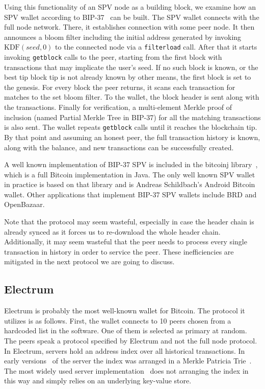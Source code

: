 \documentclass[sigconf,authordraft]{acmart}
\begin{document}
Using this functionality of an SPV node as a building block, we examine how an SPV wallet according to BIP-37~\cite{bip37} can be built. The SPV wallet connects with the full node network. There, it establishes connection with some peer node. It then announces a bloom filter including the initial address generated by invoking $\text{KDF}(seed, 0)$ to the connected node via a \texttt{filterload} call. After that it starts invoking \texttt{getblock} calls to the peer, starting from the first block with transactions that may implicate the user's seed. If no such block is known, or the best tip block tip is not already known by other means, the first block is set to the genesis. For every block the peer returns, it scans each transaction for matches to the set bloom filter. To the wallet, the block header is sent along with the transactions. Finally for verification, a multi-element Merkle proof of inclusion (named Partial Merkle Tree in BIP-37) for all the matching transactions is also sent. The wallet repeats \texttt{getblock} calls until it reaches the blockchain tip. By that point and assuming an honest peer, the full transaction history is known, along with the balance, and new transactions can be successfully created.


A well known implementation of BIP-37 SPV is included in the bitcoinj library~\cite{bitcoinj}, which is a full Bitcoin implementation in Java. The only well known SPV wallet in practice is based on that library and is Andreas Schildbach's Android Bitcoin wallet. Other applications that implement BIP-37 SPV wallets include BRD and OpenBazaar.

Note that the protocol may seem wasteful, especially in case the header chain is already synced as it forces us to re-download the whole header chain. Additionally, it may seem wasteful that the peer needs to process every single transaction in history in order to service the peer. These inefficiencies are mitigated in the next protocol we are going to discuss.


\subsection{Electrum}
Electrum is probably the most well-known wallet for Bitcoin.
The protocol it utilizes is as follows. First, the wallet connects to 10 peers chosen from a hardcoded list in the software. One of them is selected as primary at random. The peers speak a protocol specified by Electrum and not the full node protocol.
In Electrum, servers hold an address index over all historical transactions. In early versions~\cite{electrumserver} of the server the index was arranged in a Merkle Patricia Trie~\cite{ultimate}. The most widely used server implementation~\cite{electrumserverrust} does not arranging the index in this way and simply relies on an underlying key-value store.
\end{document}
